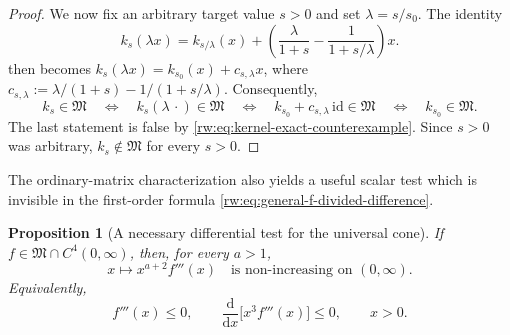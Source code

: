 \documentclass[11pt]{article}
\newtheorem{proposition}[proposition]{Proposition}
\theoremstyle{remark}
\newcommand{\1}{\mathbbm{1}}
\begin{document}
\begin{proof}
We now fix an arbitrary target value $s>0$ and set
$\lambda=s/s_0$.  The identity
\begin{equation}
 k_s(\lambda x)=k_{s/\lambda}(x)
 +\left(\frac{\lambda}{1+s}
       -\frac{1}{1+s/\lambda}\right)x.
\end{equation}
then becomes $k_s(\lambda x)=k_{s_0}(x)+c_{s,\lambda}x$, where
$c_{s,\lambda}:=\lambda/(1+s)-1/(1+s/\lambda)$.  Consequently,
\begin{equation*}
 k_s\in\mathfrak M
 \quad\Longleftrightarrow\quad
 k_s(\lambda\,\cdot)\in\mathfrak M
 \quad\Longleftrightarrow\quad
 k_{s_0}+c_{s,\lambda}\,\mathrm{id}\in\mathfrak M
 \quad\Longleftrightarrow\quad
 k_{s_0}\in\mathfrak M.
\end{equation*}
The last statement is false by
\eqref{rw:eq:kernel-exact-counterexample}.  Since $s>0$ was arbitrary,
$k_s\notin\mathfrak M$ for every $s>0$.
\end{proof}

The ordinary-matrix characterization also yields a useful scalar test
which is invisible in the first-order formula
\eqref{rw:eq:general-f-divided-difference}.

\begin{proposition}[A necessary differential test for the universal cone]
\label{rw:prop:universal-cone-differential-test}
If \(f\in\mathfrak M\cap C^4(0,\infty)\), then, for every \(a>1\),
\begin{equation}
 x\longmapsto x^{a+2}f'''(x)
 \quad\text{is non-increasing on }(0,\infty).
 \label{rw:eq:universal-cone-all-a-test}
\end{equation}
Equivalently,
\begin{equation}
 f'''(x)\leq0,
 \qquad
 \frac{\mathrm d}{\mathrm dx}\bigl[x^3f'''(x)\bigr]\leq0,
 \qquad x>0.
 \label{rw:eq:universal-cone-third-derivative-test}
\end{equation}
\end{proposition}
\end{document}
